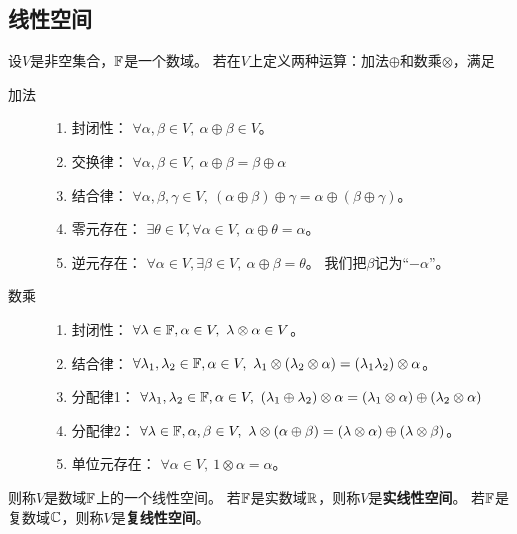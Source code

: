 \subsection{线性空间}
\begin{definition}[线性空间] \label{def-linear-space}
  设$V$是非空集合，$\mathbb{F}$是一个数域。
  若在$V$上定义两种运算：加法$\oplus$和数乘$\otimes$，满足
  \begin{description}
    \item[加法]
    \begin{enumerate}
      \item 封闭性：
      $\forall\alpha,\beta\in V,\ \alpha\oplus\beta\in V$。
      \item 交换律：
      $\forall\alpha,\beta\in V,\ \alpha\oplus\beta = \beta\oplus\alpha$
      \item 结合律：
      $\forall\alpha,\beta,\gamma\in V,\ 
        (\alpha\oplus\beta)\oplus\gamma = \alpha\oplus(\beta\oplus\gamma)$。
      \item 零元存在：
      $\exists\theta\in V,\forall\alpha\in V,\ \alpha\oplus\theta=\alpha$。
      \item 逆元存在：
      $\forall\alpha\in V,\exists\beta\in V,\ \alpha\oplus\beta=\theta$。
      我们把$\beta$记为``$-\alpha$''。
    \end{enumerate}  
    \item[数乘]
    \begin{enumerate}
      \item 封闭性：
      $\forall\lambda\in\mfF,\alpha\in V,\ \lambda\otimes\alpha\in V$。
      \item 结合律：
      $\forall\lambda_1,\lambda_2\in\mfF,\alpha\in V,\ 
        \lambda_1\otimes(\lambda_2\otimes\alpha) =
        (\lambda_1\lambda_2)\otimes\alpha$。
      \item 分配律1：
      $\forall\lambda_1,\lambda_2\in\mfF,\alpha\in V,\ 
        (\lambda_1\oplus\lambda_2)\otimes\alpha =
        (\lambda_1\otimes\alpha)\oplus(\lambda_2\otimes\alpha)$
      \item 分配律2：
      $\forall\lambda\in\mfF,\alpha,\beta\in V,\ 
        \lambda\otimes(\alpha\oplus\beta) =
        (\lambda\otimes\alpha)\oplus(\lambda\otimes\beta)$。
      \item 单位元存在：
      $\forall\alpha\in V,\ 
        1\otimes\alpha = \alpha$。
    \end{enumerate}
  \end{description}
  则称$V$是数域$\mathbb{F}$上的一个线性空间。
  若$\mathbb{F}$是实数域$\mathbb{R}$，则称$V$是\textbf{实线性空间}。
  若$\mathbb{F}$是复数域$\mathbb{C}$，则称$V$是\textbf{复线性空间}。
\end{definition}

